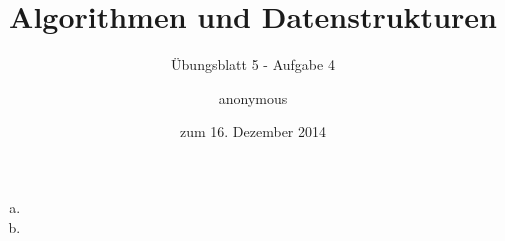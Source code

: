 \documentclass[a4paper]{scrartcl}
\title{Algorithmen und Datenstrukturen}
\subtitle{Übungsblatt 5 - Aufgabe 4}
\author{
    anonymous
}
\date{zum 16. Dezember 2014}
\begin{document}
\maketitle

\begin{enumerate}[(a)]
    \item

    \item

\end{enumerate}
\end{document}
